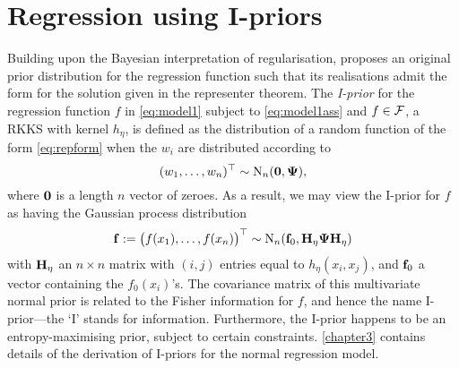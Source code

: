 \documentclass[11pt,twoside,openright,showframe]{report}
\begin{document}
\section{Regression using I-priors}
\label{sec:introregiprior}

Building upon the Bayesian interpretation of regularisation, \citet{bergsma2017} proposes an original prior distribution for the regression function such that its realisations admit the form for the solution given in the representer theorem.
The \emph{I-prior} for the regression function $f$ in \cref{eq:model1} subject to \cref{eq:model1ass} and $f\in{\mathcal F}$, a RKKS with kernel $h_\eta$, is defined as the distribution of a random function of the form \cref{eq:repform} when the $w_i$ are distributed according to 
\[
  (w_1,\dots,w_n)^\top \sim \operatorname{N}_n({\mathbf 0},{\bm\Psi}),
\]
where ${\mathbf 0}$ is a length $n$ vector of zeroes.
As a result, we may view the I-prior for $f$ as having the Gaussian process distribution
\begin{align}\label{eq:iprior}
  {\mathbf f} := \big(f(x_1),\dots,f(x_n) \big)^\top \sim \operatorname{N}_n({\mathbf f}_0, {\mathbf H}_\eta{\bm\Psi}{\mathbf H}_\eta)
\end{align}
%
with ${\mathbf H}_{\eta}$ an $n \times n$ matrix with $(i,j)$ entries equal to $h_\eta(x_i,x_j)$, and ${\mathbf f}_0$ a vector containing the $f_0(x_i)$'s.
The covariance matrix of this multivariate normal prior is related to the Fisher information for $f$, and hence the name I-prior---the `I' stands for information.
Furthermore, the I-prior happens to be an entropy-maximising prior, subject to certain constraints.
\cref{chapter3} contains details of the derivation of I-priors for the normal regression model.
\end{document}
